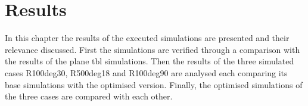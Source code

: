 \chapter{Results}


In this chapter the results of the executed simulations are presented and their relevance discussed.
First the simulations are verified through a comparison with the results of the plane \acrshort{tbl} simulations.
Then the results of the three simulated cases R100deg30, R500deg18 and R100deg90 are analysed each comparing its base simulations with the optimised version.
Finally, the optimised simulations of the three cases are compared with each other.



